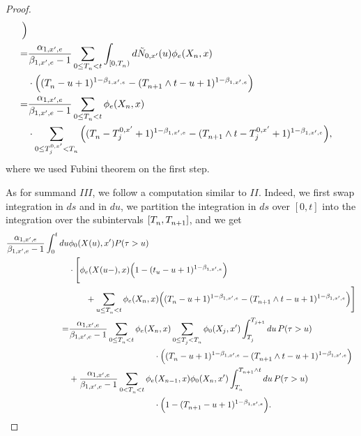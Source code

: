 \documentclass[10pt]{article}
\begin{document}
\begin{proof}
\begin{equation*}
\begin{split}
 \Big)
 \\
 =&
 \frac{\impCoef_{1,\xone,e}}{\decCoef_{1,\xone,e} - 1}
 \sum_{0\leq \arrivalTimes[]_n < t}
 \int_{[0,\arrivalTimes[]_n)} d\hybridHawkes_{0,\xone}(u)
 \transProb_{e}(\stateVariable_n, x) 
 \\
 &
 \cdot 
 \Big(
 (\arrivalTimes[]_n - u +1)^{1-\decCoef_{1,\xone,e}}
  - (\arrivalTimes[]_{n+1}\wedge t - u +1)^{1-\decCoef_{1,\xone,e}}  
 \Big)
 \\
 =&
 \frac{\impCoef_{1,\xone,e}}{\decCoef_{1,\xone,e} - 1}
 \sum_{0\leq \arrivalTimes[]_n < t}
 \transProb_{e}(\stateVariable_n, x)
 \\
 &
 \cdot
 \sum_{0\leq \arrivalTimes[0,\xone]_j < \arrivalTimes[]_n}  
 \Big(
 (\arrivalTimes[]_n - \arrivalTimes[0,\xone]_j +1)^{1-\decCoef_{1,\xone,e}}
  - (\arrivalTimes[]_{n+1}\wedge t - \arrivalTimes[0,\xone]_j +1)^{1-\decCoef_{1,\xone,e}}  
 \Big),
 \end{split}
\end{equation*}
where we used Fubini theorem on the first step. 

As for summand $III$, we follow a computation similar to $II$. Indeed, we first swap integration in $ds$ and in $du$, we partition the integration in $ds$ over $[0,t]$ into the integration over the subintervals $[\arrivalTimes[]_n , \arrivalTimes[]_{n+1}]$, and we get 
\begin{equation*}
 \begin{split}
   \frac{\impCoef_{1,\xone,e}}{\decCoef_{1,\xone,e} - 1}
   \intzerot du & \transProb_{0}(\stateVariable(u),\xone) \Prob(\terminationTime > u)
   \\
   & \cdot
   \Bigg[
   \transProb_{e}(\stateVariable(u-),x) \Big( 1- (t_u - u +1)^{1-\decCoef_{1,\xone,e}}\Big)
   \\
   & \qquad 
   + \sum_{u\leq \arrivalTimes[]_n < t} \transProb_{e}(\stateVariable_n,x)\Big( (\arrivalTimes[]_n - u +1)^{1-\decCoef_{1,\xone,e}} - (\arrivalTimes[]_{n+1}\wedge t - u +1)^{1-\decCoef_{1,\xone,e}}\Big)
   \Bigg]
   \\
   =&
   \frac{\impCoef_{1,\xone,e}}{\decCoef_{1,\xone,e} - 1}
   \sum_{0\leq \arrivalTimes[]_n < t} \transProb_{e}(\stateVariable_n, x) \sum_{0\leq \arrivalTimes[]_j < \arrivalTimes[]_n} \transProb_{0}(\stateVariable_j, \xone) \int_{\arrivalTimes[]_{j}}^{\arrivalTimes[]_{j+1}}du \, \Prob(\terminationTime>u)
   \\
   & \qquad \qquad \qquad \qquad \qquad \cdot 
   \Big( (\arrivalTimes[]_n - u +1)^{1-\decCoef_{1,\xone,e}} - (\arrivalTimes[]_{n+1}\wedge t - u +1)^{1-\decCoef_{1,\xone,e}}\Big)
   \\
   & + 
   \frac{\impCoef_{1,\xone,e}}{\decCoef_{1,\xone,e} - 1}
   \sum_{0<  \arrivalTimes[]_n < t} \transProb_{e}(\stateVariable_{n-1}, x)  \transProb_{0}(\stateVariable_n, \xone)\int_{\arrivalTimes[]_n}^{\arrivalTimes[]_{n+1}\wedge t} du \, \Prob(\terminationTime>u)
   \\
   & \qquad \qquad \qquad \qquad \qquad \cdot 
   \Big( 1- (\arrivalTimes[]_{n+1} - u +1)^{1-\decCoef_{1,\xone,e}}\Big).
 \end{split}
\end{equation*}
\end{proof}
\end{document}
